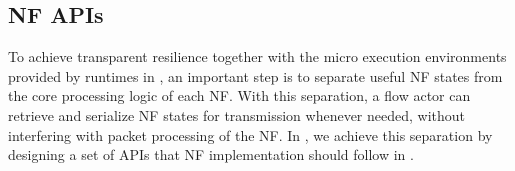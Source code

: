 

\subsection{NF APIs}
\label{sec:NFAPIs}

To achieve transparent resilience together with the micro execution environments provided by runtimes in \nfactor, an important step is to separate useful NF states from the core processing logic of each NF. With this separation, a flow actor can retrieve and serialize NF states for transmission whenever needed, without interfering with packet processing of the NF. In \nfactor, we achieve this separation by designing a set of APIs that NF implementation should follow in \nfactor. 
 
